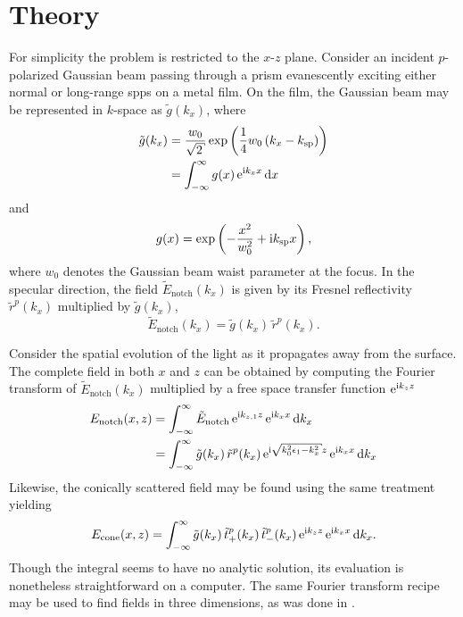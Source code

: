 \section{Theory}\label{sec:interferencetheory}
For simplicity the problem is restricted to the $x$-$z$ plane.  Consider an
incident $p$-polarized Gaussian beam passing through a prism evanescently
exciting either normal or long-range \glspl{spp} on a metal film.  On the film,
the Gaussian beam may be represented in $k$-space as $\tilde{g}(k_x)$,
where
\begin{align}
\tilde{g}(k_x) &= \frac{w_0}{\sqrt{2}} \exp\left(\frac{1}{4}w_0\left(k_x - \ksp\right)\right)\\
&= \intinfty g(x)\, \me^{\mi k_x x} \md x
\end{align}
and
\begin{equation}
g(x) = \exp\left(-\frac{x^2}{w_0^2} + {\mathrm{i}} k_\mathrm{sp} x\right),
\end{equation}
where $w_0$ denotes the Gaussian beam waist parameter at the focus.  In the
specular direction, the field $\tilde{E}_\mathrm{notch}(k_x)$ is given by its
Fresnel reflectivity $\tilde{r}^p(k_x)$ multiplied by $\tilde{g}(k_x)$,
\begin{equation}
\tilde{E}_\mathrm{notch}(k_x)=\tilde{g}(k_x)\,\tilde{r}^p(k_x).
\end{equation}

Consider the spatial evolution of the light as it propagates
away from the surface.
The complete field in both $x$ and $z$ can be obtained by computing
the Fourier transform of $\tilde{E}_\mathrm{notch}(k_x)$ multiplied
by a free space transfer function ${\mathrm{e}}^{{\mathrm{i}} k_{z} z}$
\begin{align}
E_\mathrm{notch}(x,z) &= \intinfty \tilde{E}_\mathrm{notch}\, \me^{\mi k_{z,1} z}\, \me^{\mi k_x x} \md k_x\\
 &= \intinfty \tilde{g}(k_x)\, \tilde{r}^p(k_x)\, \me^{\mi \sqrt{k_0^2 \epsilon_1 - k_x^2}z}\, \me^{\mi k_x x} \md k_x
\label{eqn:fourier123}
\end{align}
Likewise, the conically scattered field may be found using the same
treatment yielding
\begin{align}
E_\text{cone}(x,z) = \int_{-\infty}^{\infty} \tilde{g}(k_x)\,
\tilde{t}^p_+(k_x)\, \tilde{t}^p_-(k_x)\,{\mathrm{e}}^{{\mathrm{i}} k_z z}\, {\mathrm{e}}^{{\mathrm{i}} k_x x}
\,\mathrm{d} k_x.
\label{eqn:fourier321}
\end{align}
Though the integral seems to have no analytic solution, its evaluation is
nonetheless straightforward on a computer.  The same Fourier transform
recipe may be used to find fields in three dimensions, as was done in
.


